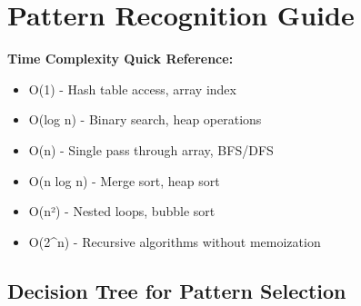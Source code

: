 \documentclass[10pt,a4paper]{article}
\begin{document}
\section{Pattern Recognition Guide}

\begin{complexitybox}
\textbf{Time Complexity Quick Reference:}
\begin{itemize}
\item O(1) - Hash table access, array index
\item O(log n) - Binary search, heap operations
\item O(n) - Single pass through array, BFS/DFS
\item O(n log n) - Merge sort, heap sort
\item O(n²) - Nested loops, bubble sort
\item O(2^n) - Recursive algorithms without memoization
\end{itemize}
\end{complexitybox}

\subsection{Decision Tree for Pattern Selection}
\end{document}
